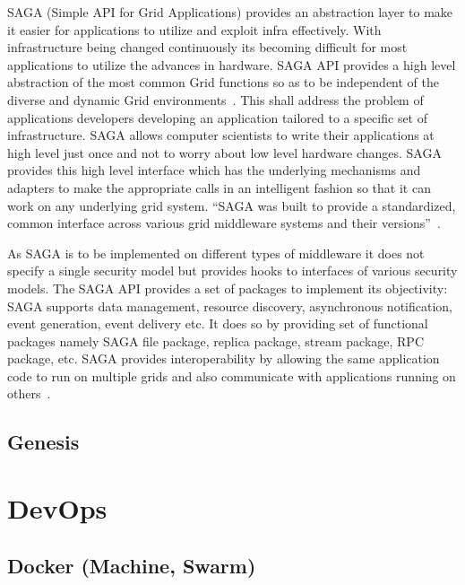 SAGA (Simple API for Grid Applications) provides an abstraction layer
to make it easier for applications to utilize and exploit infra
effectively. With infrastructure being changed continuously its
becoming difficult for most applications to utilize the advances in
hardware. SAGA API provides a high level abstraction of the most
common Grid functions so as to be independent of the diverse and
dynamic Grid environments~\cite{saga-paper}. This shall address the
problem of applications developers developing an application tailored
to a specific set of infrastructure.  SAGA allows computer scientists
to write their applications at high level just once and not to worry
about low level hardware changes. SAGA provides this high level
interface which has the underlying mechanisms and adapters to make the
appropriate calls in an intelligent fashion so that it can work on any
underlying grid system. ``SAGA was built to provide a standardized,
common interface across various grid middleware systems and their
versions''~\cite{www-saga-ogf-document}.

As SAGA is to be implemented on different types of middleware it does
not specify a single security model but provides hooks to interfaces
of various security models. The SAGA API provides a set of packages to
implement its objectivity: SAGA supports data management, resource
discovery, asynchronous notification, event generation, event delivery
etc. It does so by providing set of functional packages namely SAGA
file package, replica package, stream package, RPC package, etc. SAGA
provides interoperability by allowing the same application code to run
on multiple grids and also communicate with applications running on
others~\cite{saga-paper}.

\subsection{Genesis}

\section{DevOps}
\label{S:o-DevOps}

\subsection{Docker (Machine, Swarm)}

